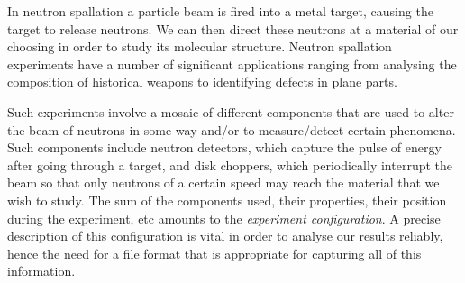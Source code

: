 In neutron spallation a particle beam is fired into a metal target, causing the target to release neutrons. We can then direct these neutrons at a material of our choosing in order to study its molecular structure. Neutron spallation experiments have a number of significant applications ranging from analysing the composition of historical weapons to identifying defects in plane parts.

Such experiments involve a mosaic of different components that are used to alter the beam of neutrons in some way and/or to measure/detect certain phenomena. Such components include neutron detectors, which capture the pulse of energy after going through a target, and disk choppers, which periodically interrupt the beam so that only neutrons of a certain speed may reach the material that we wish to study. The sum of the components used, their properties, their position during the experiment, etc amounts to the \textit{experiment configuration}. A precise description of this configuration is vital in order to analyse our results reliably, hence the need for a file format that is appropriate for capturing all of this information.
